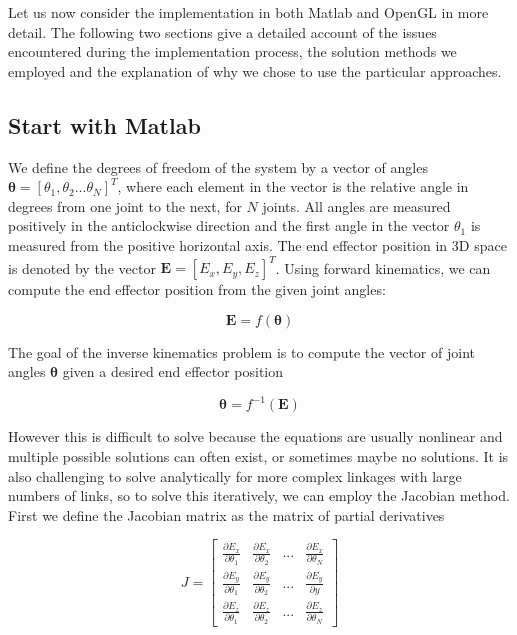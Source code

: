 \documentclass[paper=a4, fontsize=11pt]{scrartcl} %
\numberwithin{equation}{section} %
\numberwithin{figure}{section} %
\numberwithin{table}{section} %
\newcommand{\vect}[1]{\mathbf{#1}}
\newcommand{\params}{\boldsymbol{\theta}}
\newcommand{\dn}[1]{\partial{#1}}
\begin{document}
Let us now consider the implementation in both Matlab and OpenGL in more detail. The following two sections give a detailed account of the issues encountered during the implementation process, the solution methods we employed and the explanation of why we chose to use the particular approaches. \\


\subsection{Start with Matlab} 
We define the degrees of freedom of the system by a vector of angles $\params = [\theta_1, \theta_2...\theta_N]^T$, where each element in the vector is the relative angle in degrees from one joint to the next, for $N$ joints. All angles are measured positively in the anticlockwise direction and the first angle in the vector $\theta_1$ is measured from the positive horizontal axis. The end effector position in 3D space is denoted by the vector 
$\vect{E} = [E_x, E_y, E_z]^T$. Using forward kinematics, we can compute the end effector position from the given joint angles:

\begin{equation}
\vect{E} = f(\params)
\end{equation}

The goal of the inverse kinematics problem is to compute the vector of joint angles $\params$ given a desired end effector position

\begin{equation}
\params = f^{-1}(\vect{E})
\end{equation}

However this is difficult to solve because the equations are usually nonlinear and multiple possible solutions can often exist, or sometimes maybe no solutions. It is also challenging to solve analytically for more complex linkages with large numbers of links, so to solve this iteratively, we can employ the Jacobian method. First we define the Jacobian matrix as the matrix of partial derivatives

\begin{equation}
J = \left[
\begin{array}{cccc}
\frac{\dn{E_x}}{\dn{\theta_1}} & \frac{\dn{E_x}}{\dn{\theta_2}} & ... & \frac{\dn{E_x}}{\dn{\theta_N}} 
\\[0.2cm]
\frac{\dn{E_y}}{\dn{\theta_1}} & \frac{\dn{E_y}}{\dn{\theta_2}} & ... & \frac{\dn{E_y}}{\dn{y}} 
\\[0.2cm]
\frac{\dn{E_z}}{\dn{\theta_1}} & \frac{\dn{E_z}}{\dn{\theta_2}} & ... & \frac{\dn{E_z}}{\dn{\theta_N}}
\end{array}
\right]
\end{equation}
\end{document}

